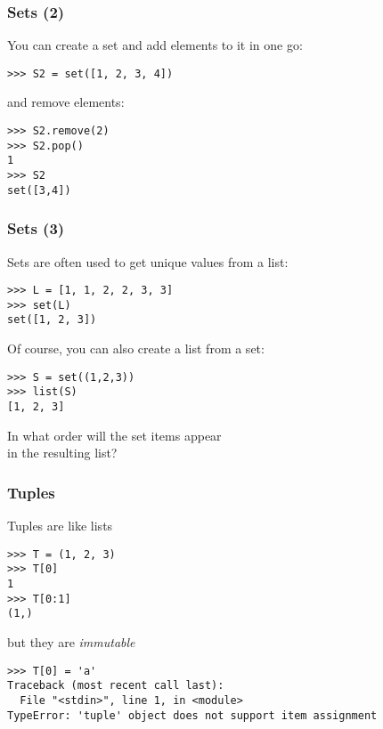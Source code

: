 \documentclass[english,serif,mathserif,xcolor=pdftex,dvipsnames,table]{beamer}
\begin{document}
\begin{frame}[fragile]
  \frametitle{Sets (2)}
You can create a set and add elements to it in one go:
\begin{lstlisting}
>>> S2 = set([1, 2, 3, 4])
\end{lstlisting}

and remove elements:

\begin{lstlisting}
>>> S2.remove(2)
>>> S2.pop()
1
>>> S2
set([3,4])
\end{lstlisting}
\end{frame}


\begin{frame}[fragile]
  \frametitle{Sets (3)}
  Sets are often used to get unique values from a list:
  \begin{lstlisting}
>>> L = [1, 1, 2, 2, 3, 3]
>>> set(L)
set([1, 2, 3])
 \end{lstlisting}

\+\pause
Of course, you can also create a list from a set:
\begin{lstlisting}
>>> S = set((1,2,3))
>>> list(S)
[1, 2, 3]
\end{lstlisting}

\+\pause
\begin{question}
  In what order will the set items appear \\ in the resulting list?
\end{question}

\end{frame}


\begin{frame}[fragile]
  \frametitle{Tuples}
  Tuples are like lists
  \begin{lstlisting}
>>> T = (1, 2, 3)
>>> T[0]
1
>>> T[0:1]
(1,)
  \end{lstlisting}

  \+
but they are \textit{immutable}

\begin{lstlisting}[basicstyle=\footnotesize\ttfamily]
>>> T[0] = 'a'
Traceback (most recent call last):
  File "<stdin>", line 1, in <module>
TypeError: 'tuple' object does not support item assignment
\end{lstlisting}
\end{frame}

\end{document}
